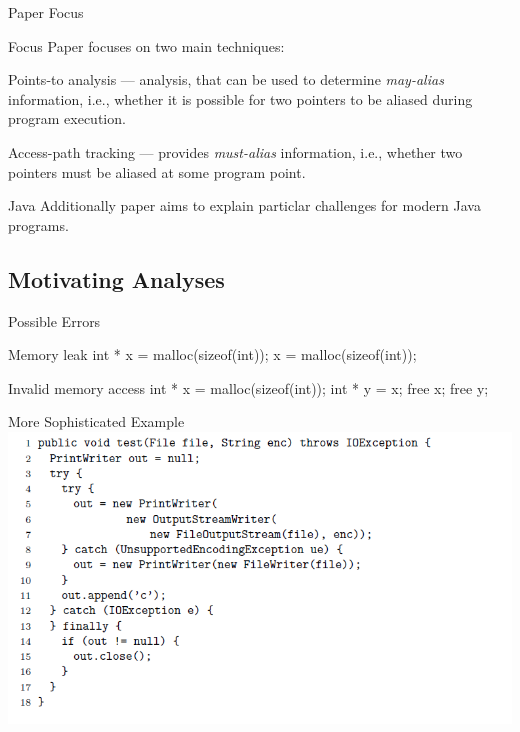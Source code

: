 \documentclass{beamer}
\begin{document}
\begin{frame}{Paper Focus}
	\begin{block}{Focus}
		Paper focuses on two main techniques:
	\end{block}
	\pause
	\begin{block}{}
		Points-to analysis --- analysis, that can be used to determine \textit{may-alias} information,
		i.e., whether it is possible for two pointers to be aliased during program execution.
	\end{block}
	\pause
	\begin{block}{}
		Access-path tracking --- provides \textit{must-alias} information, i.e., whether two pointers must be
		aliased at some program point.
	\end{block}
	\pause
	\begin{block}{Java}
		Additionally paper aims to explain particlar challenges for modern Java programs.
	\end{block}
\end{frame}

\subsection{Motivating Analyses}

\begin{frame}{Possible Errors}
	\begin{block}{Memory leak}
		int * x = malloc(sizeof(int));
		\newline
		x = malloc(sizeof(int));
	\end{block}
	\pause
	\begin{block}{Invalid memory access}
		int * x = malloc(sizeof(int));
		\newline
		int * y = x; 
		\newline
		free x;
		\newline
		free y;
	\end{block}	
\end{frame}

\begin{frame}{More Sophisticated Example}
	\includegraphics[width=\paperwidth]{fig1.png}
\end{frame}
\end{document}
